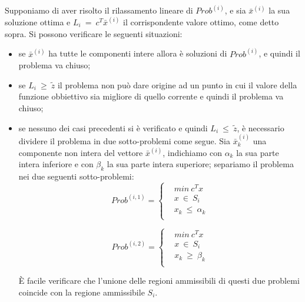 Supponiamo di aver risolto il rilassamento lineare di $Prob^{(i)}$, e sia $\bar{x}^{(i)}$ la sua soluzione ottima e $L_i ~ = ~ c^T \bar{x}^{(i)}$ il corrispondente valore ottimo, come detto sopra.
Si possono verificare le seguenti situazioni:
\begin{itemize}
\item se $\bar{x}^{(i)}$ ha tutte le componenti intere allora è soluzioni di $Prob^{(i)}$, e quindi il problema va chiuso;
\item se $L_i ~ \geq ~ \tilde{z}$ il problema non può dare origine ad un punto in cui il valore della funzione obbiettivo sia migliore di quello corrente e quindi il problema va chiuso;
\item se nessuno dei casi precedenti si è verificato e quindi $L_i ~ \leq ~ \tilde{z}$, è necessario dividere il problema in due sotto-problemi come segue.
Sia $\bar{x}^{(i)}_k$ una componente non intera del vettore $\bar{x}^{(i)}$, indichiamo con $\alpha_k$ la sua parte intera inferiore e con $\beta_k$ la sua parte intera superiore; separiamo il problema nei due seguenti sotto-problemi:
\begin{equation}
\label{eq:sottoProb1}
Prob^{(i,1)}=
\begin{cases}
& min ~ c^T x \\
& x ~ \in ~ S_i \\
& x_k ~ \leq ~ \alpha_k \\
\end{cases}
\end{equation}

\begin{equation}
\label{eq:sottoProb2}
Prob^{(i,2)}=
\begin{cases}
& min ~ c^T x \\
& x ~ \in ~ S_i \\
& x_k ~ \geq ~ \beta_k \\
\end{cases}
\end{equation}

È facile verificare che l'unione delle regioni ammissibili di questi due problemi coincide con la regione ammissibile $S_i$.
\end{itemize}

